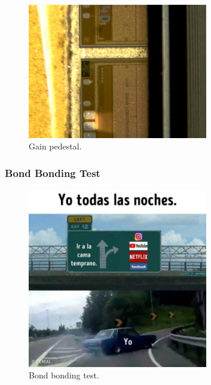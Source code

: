 \begin{figure}[!h]
  \centering
  \includegraphics[width=0.7\textwidth]{../images/ch7/6}
  \caption[Gain Pedestal.]{Gain pedestal.}\label{fig:vis_insp}
\end{figure}


\subsubsection{Bond Bonding Test}


\begin{figure}[!h]
  \centering
  \includegraphics[width=0.7\textwidth]{../images/ch7/7}
  \caption[Bond bonding test.]{Bond bonding test.}\label{fig:vis_insp}
\end{figure}


